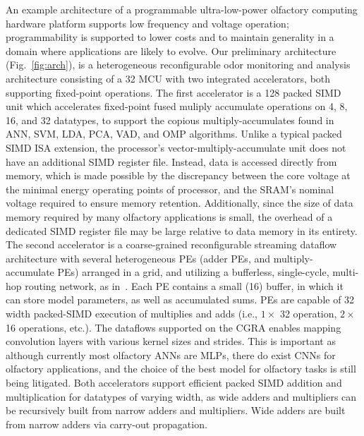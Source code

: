 An example architecture of a programmable
ultra-low-power olfactory computing hardware platform supports low frequency
and voltage operation; programmability is supported to lower costs and to
maintain generality in a domain where applications are likely to evolve.  Our preliminary
architecture (Fig.~\ref{fig:arch}), is a heterogeneous reconfigurable
odor monitoring and analysis architecture consisting of a \SI{32}{\bit} 
MCU with two integrated accelerators, both supporting fixed-point
operations. 
The first accelerator is a \SI{128}{\bit} packed SIMD unit which accelerates
fixed-point fused muliply accumulate operations on 4, 8, 16, and \SI{32}{\bit}
datatypes, to support the copious multiply-accumulates found in ANN, SVM,
LDA, PCA, VAD, and OMP algorithms.
Unlike a typical packed SIMD ISA extension, the processor's vector-multiply-accumulate unit does not have an
additional SIMD register file.  Instead, data is accessed directly from memory,
which is made possible by the discrepancy between the core voltage at the
minimal energy operating points of processor, and the
SRAM's nominal voltage required to ensure memory retention. Additionally,
since the size of data memory required by many olfactory applications
is small, the overhead of a dedicated SIMD register file may be large relative
to data memory in its entirety.
The second accelerator is a coarse-grained
reconfigurable streaming dataflow architecture with several heterogeneous PEs
(adder PEs, and multiply-accumulate PEs) arranged in a grid, and
utilizing a bufferless, single-cycle, multi-hop routing network, as
in~\cite{wang2019hycube, gobieski2021snafu}. Each PE contains a small
(\SI{16}{\byte}) buffer, in which it can store model parameters, as well as
accumulated sums. PEs are capable of \SI{32}{\bit} width packed-SIMD
execution of multiplies and adds (i.e., $1\times$ \SI{32}{\bit} operation,
$2\times$ \SI{16}{\bit} operations, etc.).  The dataflows supported  on
the CGRA enables mapping convolution layers with various kernel sizes and strides.
This is important as although currently most olfactory ANNs are MLPs,
there do exist CNNs for olfactory applications, and the choice of the best
model for olfactory tasks is still being litigated.
Both accelerators support efficient packed SIMD addition and multiplication for
datatypes of varying width, as wide adders and multipliers can be
recursively built from narrow adders and multipliers.
Wide adders are built from narrow adders via carry-out propagation.

